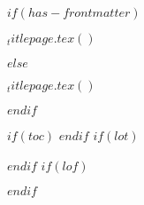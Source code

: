 $if(has-frontmatter)$
  \begin{frontmatter}
  \begin{titlepage}
  $_titlepage.tex()$
  \end{titlepage}
  \end{frontmatter}
$else$
  \begin{titlepage}
  $_titlepage.tex()$
  \end{titlepage}
$endif$







$if(toc)$
\tableofcontents
$endif$
$if(lot)$
\listoftables
$endif$
$if(lof)$
\listoffigures
$endif$

